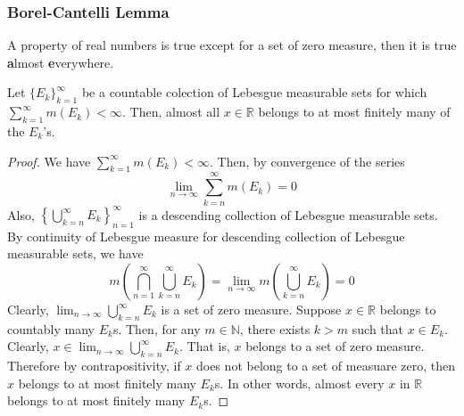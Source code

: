 \subsubsection{Borel-Cantelli Lemma}
\begin{definition}[ae]
	A property of real numbers is true except for a set of zero measure, then it is true \textbf{a}lmost \textbf{e}verywhere.
\end{definition}

\begin{lemma}
	Let $\{E_k\}_{k=1}^\infty$ be a countable colection of Lebesgue measurable sets for which $\sum_{k=1}^\infty m(E_k) < \infty$.
	Then, almost all $x \in \mathbb{R}$ belongs to at most finitely many of the $E_k$'s.
\end{lemma}
\begin{proof}
	We have $\sum_{k=1}^\infty m(E_k) < \infty$.
	Then, by convergence of the series 
	$$\lim_{n \to \infty} \sum_{k=n}^\infty m(E_k) = 0$$
	Also, $\displaystyle \left\{ \bigcup_{k=n}^\infty E_k \right\}_{n=1}^\infty$ is a descending collection of Lebesgue measurable sets.
	By continuity of Lebesgue measure for descending collection of Lebesgue measurable sets, we have
	\begin{equation*}
		m \left( \bigcap_{n=1}^\infty \bigcup_{k=n}^\infty E_k \right) = \lim_{n \to \infty} m \left( \bigcup_{k=n}^\infty E_k \right) = 0
	\end{equation*}
	Clearly, $\displaystyle \lim_{n \to \infty} \bigcup_{k =n}^\infty E_k$ is a set of zero measure.
	Suppose $x \in \mathbb{R}$ belongs to countably many $E_k$s.
	Then, for any $m \in \mathbb{N}$, there exists $k > m$ such that  $x \in E_k$.
	Clearly, $\displaystyle x \in \lim_{n \to \infty} \bigcup_{k=n}^\infty E_k$.
	That is, $x$ belongs to a set of zero measure.
	Therefore by contrapositivity, if $x$ does not belong to a set of measuare zero, then $x$ belongs to at most finitely many $E_k$s.	
	In other words, almost every $x$ in $\mathbb{R}$ belongs to at most finitely many $E_k$s.
\end{proof}


